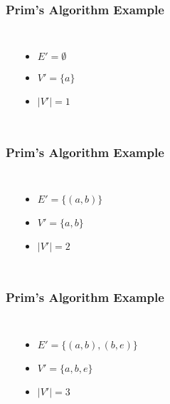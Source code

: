 \documentclass[dvipsnames]{beamer}
\begin{document}
\begin{frame}
  \frametitle{Prim's Algorithm Example}

  \begin{columns}
    \begin{center}
    \end{center}

    \pause
    \begin{itemize}
      \item $E' = \emptyset$
      \item $V' = \{ a \}$
      \item $|V'| = 1$
    \end{itemize}
  \end{columns}
\end{frame}

\begin{frame}
  \frametitle{Prim's Algorithm Example}

  \begin{columns}
    \begin{center}
    \end{center}

    \pause
    \begin{itemize}
      \item $E' = \{ (a,b) \}$
      \item $V' = \{ a, b \}$
      \item $|V'| = 2$
    \end{itemize}
  \end{columns}
\end{frame}

\begin{frame}
  \frametitle{Prim's Algorithm Example}

  \begin{columns}
    \begin{center}
    \end{center}

    \pause
    \begin{itemize}
      \item $E' = \{ (a,b), (b,e) \}$
      \item $V' = \{ a, b, e \}$
      \item $|V'| = 3$
    \end{itemize}
  \end{columns}
\end{frame}
\end{document}
